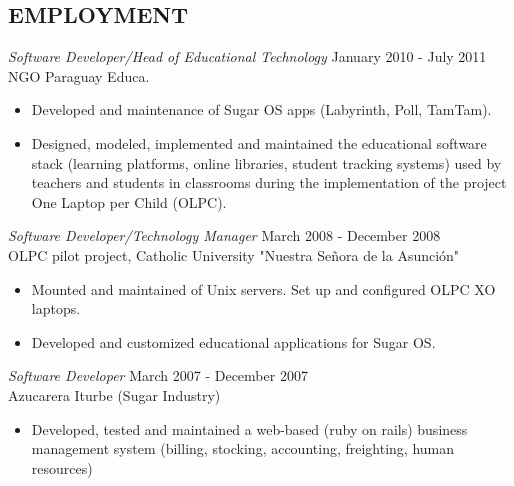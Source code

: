 \documentclass[line,margin]{res}
\begin{document}
\begin{resume}
\section{EMPLOYMENT} 
{\sl Software Developer/Head of Educational Technology} \hfill January 2010 - July 2011 \\
NGO Paraguay Educa. 
\begin{itemize}  \itemsep -2pt %
\item Developed and maintenance of Sugar OS apps (Labyrinth, Poll, TamTam).
\item Designed, modeled, implemented and maintained the educational software stack (learning platforms, online libraries, student tracking systems) used by teachers and students in classrooms during the implementation of the project One Laptop per Child (OLPC).
\end{itemize}
 
{\sl Software Developer/Technology Manager} \hfill        March 2008 - December 2008 \\
OLPC pilot project, Catholic University "Nuestra Se\~nora de la Asunci\'on" 
\begin{itemize}  \itemsep -2pt %
	\item Mounted and maintained of Unix servers. Set up and configured OLPC XO laptops. 
	\item Developed and customized educational applications for Sugar OS.
\end{itemize} 
     
{\sl Software Developer} \hfill        March 2007 - December 2007 \\
Azucarera Iturbe (Sugar Industry)
\begin{itemize}
	\item Developed, tested and maintained a web-based (ruby on rails) business management system (billing, stocking, accounting, freighting, human resources)
\end{itemize} 
 

\end{resume}
\end{document}
